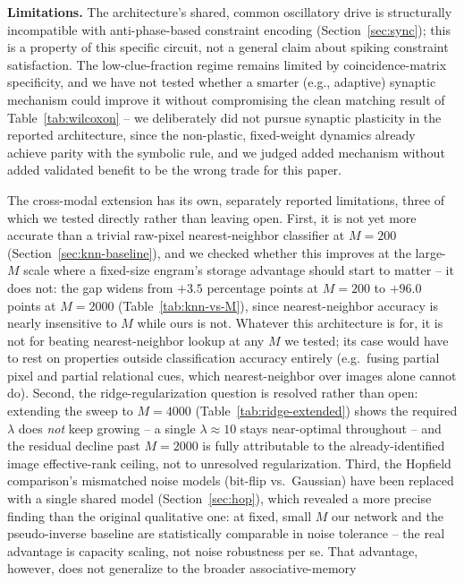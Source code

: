 \documentclass[11pt]{article}
\begin{document}
\textbf{Limitations.} The architecture's shared, common oscillatory drive is structurally
incompatible with anti-phase-based constraint encoding (Section~\ref{sec:sync}); this is a
property of this specific circuit, not a general claim about spiking constraint satisfaction.
The low-clue-fraction regime remains limited by coincidence-matrix specificity, and we have
not tested whether a smarter (e.g., adaptive) synaptic mechanism could improve it without
compromising the clean matching result of Table~\ref{tab:wilcoxon} -- we deliberately did not
pursue synaptic plasticity in the reported architecture, since the non-plastic, fixed-weight
dynamics already achieve parity with the symbolic rule, and we judged added mechanism
without added validated benefit to be the wrong trade for this paper.

The cross-modal extension has its own, separately reported limitations, three of which we
tested directly rather than leaving open. First, it is not yet more accurate than a trivial
raw-pixel nearest-neighbor classifier at $M{=}200$ (Section~\ref{sec:knn-baseline}), and we
checked whether this improves at the large-$M$ scale where a fixed-size engram's storage
advantage should start to matter -- it does not: the gap widens from $+3.5$ percentage points
at $M{=}200$ to $+96.0$ points at $M{=}2000$ (Table~\ref{tab:knn-vs-M}), since nearest-neighbor
accuracy is nearly insensitive to $M$ while ours is not. Whatever this architecture is for, it
is not for beating nearest-neighbor lookup at any $M$ we tested; its case would have to rest
on properties outside classification accuracy entirely (e.g.\ fusing partial pixel and partial
relational cues, which nearest-neighbor over images alone cannot do). Second, the
ridge-regularization question is resolved rather than open: extending the sweep to
$M{=}4000$ (Table~\ref{tab:ridge-extended}) shows the required $\lambda$ does \emph{not} keep
growing -- a single $\lambda{\approx}10$ stays near-optimal throughout -- and the residual
decline past $M{=}2000$ is fully attributable to the already-identified image effective-rank
ceiling, not to unresolved regularization. Third, the Hopfield comparison's mismatched noise
models (bit-flip vs.\ Gaussian) have been replaced with a single shared model
(Section~\ref{sec:hop}), which revealed a more precise finding than the original qualitative
one: at fixed, small $M$ our network and the pseudo-inverse baseline are statistically
comparable in noise tolerance -- the real advantage is capacity scaling, not noise robustness
per se. That advantage, however, does not generalize to the broader associative-memory
\end{document}
